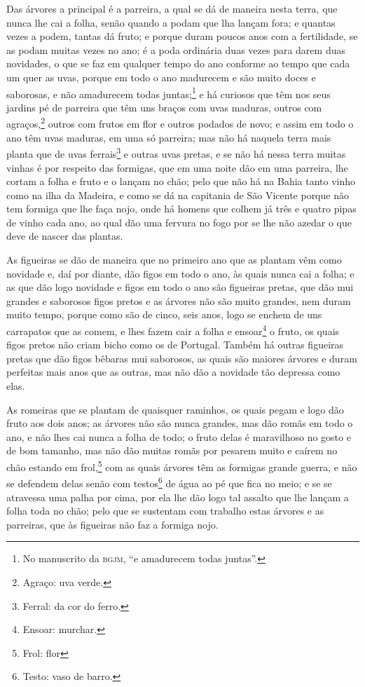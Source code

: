 Das árvores a principal é a parreira, a qual se dá de maneira nesta terra, que nunca lhe
cai a folha, senão quando a podam que lha lançam fora; e quantas vezes a podem, tantas dá
fruto; e porque duram poucos anos com a fertilidade, se as podam muitas vezes no ano; é a
poda ordinária duas vezes para darem duas novidades, o que se faz em qualquer tempo do ano
conforme ao tempo que cada um quer as uvas, porque em todo o ano madurecem e são muito
doces e saborosas, e não amadurecem todas juntas;\footnote{ No manuscrito da
\textsc{bgjm}, ``e amadurecem todas juntas''.} e há curiosos que têm nos seus jardins pé
de parreira que têm uns braços com uvas maduras, outros com agraços,\footnote{ Agraço: uva
verde.} outros com frutos em flor e outros podados de novo; e assim em todo o
ano têm uvas maduras, em uma só parreira; mas não há naquela terra mais planta que de uvas
ferrais\footnote{ Ferral: da cor do ferro.} e outras uvas pretas, e se não há nessa terra
muitas vinhas é por respeito das formigas,
que em uma noite dão em uma parreira, lhe cortam a folha e fruto e o lançam no chão; pelo
que não há na Bahia tanto vinho como na ilha da Madeira, e como se dá na capitania de São
Vicente porque não tem formiga que lhe faça nojo, onde há homens que colhem já três e
quatro pipas de vinho cada ano, ao qual dão uma fervura no fogo por se lhe não azedar o
que deve de nascer das plantas.

As figueiras se dão de maneira que no primeiro ano que as plantam vêm como novidade e, daí
por diante, dão figos em todo o ano, às quais nunca cai a folha; e as que dão logo
novidade e figos em todo o ano são figueiras pretas, que dão mui grandes e saborosos figos
pretos e as árvores não são muito grandes, nem duram muito tempo, porque como são de
cinco, seis anos, logo se enchem de uns carrapatos que as comem, e lhes fazem cair a folha
e ensoar\footnote{ Ensoar: murchar.} o fruto, os quais figos pretos não criam
bicho como os de Portugal. Também há outras figueiras pretas que dão figos bêbaras mui
saborosos, as quais são maiores árvores e duram perfeitas mais anos que as outras, mas não
dão a novidade tão depressa como elas.

As romeiras que se plantam de quaisquer raminhos, os quais pegam e logo dão fruto aos dois
anos; as árvores não são nunca grandes, mas dão romãs em todo o ano, e não lhes cai nunca
a folha de todo; o fruto delas é maravilhoso no gosto e de bom tamanho, mas não dão muitas
romãs por pesarem muito e caírem no chão estando em frol,\footnote{Frol: flor} com as quais árvores têm as
formigas grande guerra, e não se defendem delas senão com testos\footnote{ Testo: vaso de
barro.} de água ao pé que fica no meio; e se se atravessa uma palha por cima, por ela lhe
dão logo tal assalto que lhe lançam a folha toda no chão; pelo que se sustentam com
trabalho estas árvores e as parreiras, que às figueiras não faz a formiga nojo.

